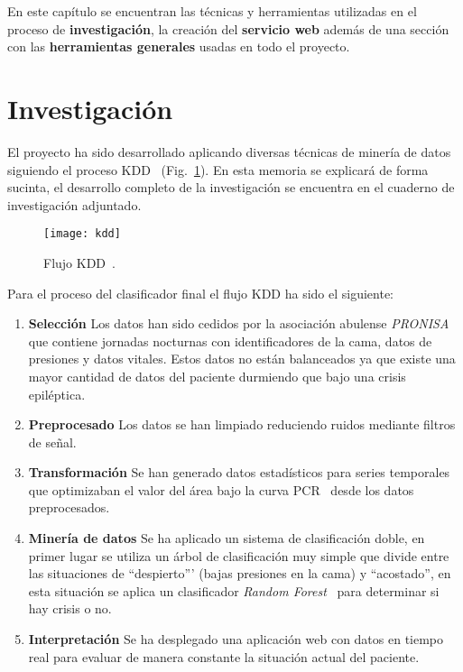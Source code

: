
En este capítulo se encuentran las técnicas y herramientas utilizadas en el proceso de \textbf{investigación}, la creación del \textbf{servicio web} además de una sección con las \textbf{herramientas generales} usadas en todo el proyecto.

\section{Investigación}

El proyecto ha sido desarrollado aplicando diversas técnicas de minería de datos siguiendo el proceso KDD~\cite{ubu:mineria1} (Fig.~\ref{fig:kdd}). En esta memoria se explicará de forma sucinta, el desarrollo completo de la investigación se encuentra en el cuaderno de investigación adjuntado.

\begin{figure}
	\centering
	\texttt{[image: kdd]}
	\caption{Flujo KDD~\cite{fayyad1996data}.}
	\label{fig:kdd}
\end{figure}

Para el proceso del clasificador final el flujo KDD ha sido el siguiente:

\begin{enumerate}
	\item \textbf{Selección}
		Los datos han sido cedidos por la asociación abulense \textit{PRONISA} que contiene jornadas nocturnas con identificadores de la cama, datos de presiones y datos vitales. Estos datos no están balanceados ya que existe una mayor cantidad de datos del paciente durmiendo que bajo una crisis epiléptica.
	\item \textbf{Preprocesado}
		Los datos se han limpiado reduciendo ruidos mediante filtros de señal.
	\item \textbf{Transformación}
		Se han generado datos estadísticos para series temporales que optimizaban el valor del área bajo la curva PCR~\cite{saito2015precision} desde los datos preprocesados.
	\item \textbf{Minería de datos}
		Se ha aplicado un sistema de clasificación doble, en primer lugar se utiliza un árbol de clasificación muy simple que divide entre las situaciones de ``despierto''' (bajas presiones en la cama) y ``acostado'', en esta situación se aplica un clasificador \textit{Random Forest}~\cite{breiman2001random} para determinar si hay crisis o no.
	\item \textbf{Interpretación}
		Se ha desplegado una aplicación web con datos en tiempo real para evaluar de manera constante la situación actual del paciente.
\end{enumerate}

